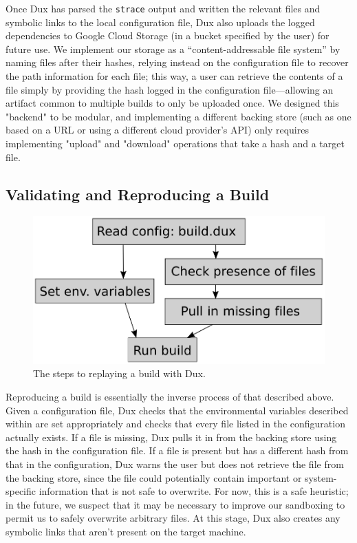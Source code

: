 \documentclass[10pt,conference]{IEEEtran}
\begin{document}
Once Dux has parsed the \texttt{strace} output and written the relevant files and symbolic links to
the local configuration file, Dux also uploads the logged dependencies to Google Cloud Storage (in a
bucket specified by the user) for future use. We implement our storage as a ``content-addressable
file system'' by naming files after their hashes, relying instead on the configuration file to recover
the path information for each file; this way, a user can retrieve the contents of a file simply by 
providing the hash logged in the configuration file---allowing an artifact common to multiple builds to
only be uploaded once. We designed this "backend" to be modular, and implementing a different backing store
(such as one based on a URL or using a different cloud provider's API) only requires implementing
"upload" and "download" operations that take a hash and a target file.

\subsection{Validating and Reproducing a Build}

\begin{figure}
\includegraphics[width=\columnwidth]{duxcheck}
\caption{The steps to replaying a build with Dux.}
\end{figure}

Reproducing a build is essentially the inverse process of that described above. Given a configuration file,
Dux checks that the environmental variables described within are set appropriately and checks that every
file listed in the configuration actually exists. If a file is missing, Dux pulls it in from the backing store
using the hash in the configuration file. If a file is present but has a different hash from that
in the configuration, Dux warns the user but does not retrieve the file from the backing store, since the file
could potentially contain important or system-specific information that is not safe to overwrite. For now,
this is a safe heuristic; in the future, we suspect that it may be necessary to improve our sandboxing to permit
us to safely overwrite arbitrary files. At this stage, Dux also creates any symbolic links that aren't present
on the target machine.
\end{document}
